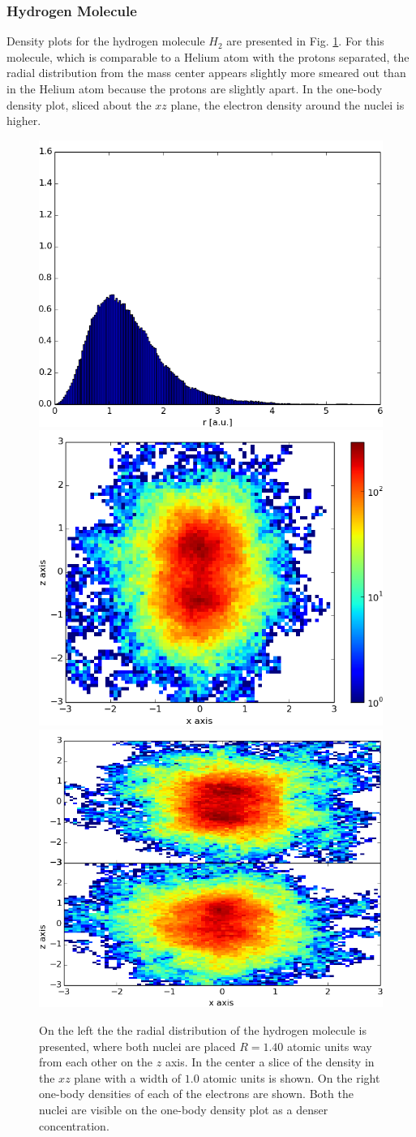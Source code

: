 		\subsubsection{Hydrogen Molecule}
			Density plots for the hydrogen molecule
                        $H_{2}$ are presented in
                        Fig. \ref{fig:oneBodyDensityHydrogenTwo}. For
                        this molecule, which is comparable to a Helium
                        atom with the protons separated, the radial
                        distribution from the mass center appears
                        slightly more smeared out than in the Helium
                        atom because the protons are slightly apart.
                        In the one-body density plot, sliced about the
                        \(xz\) plane, the electron density around the
                        nuclei is higher. 

			\begin{figure}[H]
				\centering \includegraphics[width=0.32\linewidth]{content/Results/figures/ChargeDensityHydrogenTwo}
				\centering \includegraphics[width=0.32\linewidth]{content/Results/figures/OneBodyDensityHydrogenTwo}
				\centering \includegraphics[width=0.32\linewidth]{content/Results/figures/OneBodyDensityElectronsHydrogenTwo}
				\protect\caption{On the left the the radial distribution of the hydrogen molecule is presented, where both nuclei are placed \(R = 1.40\) atomic units way from each other on the \(z\) axis. In the center a slice of the density in the \(xz\) plane with a width of \(1.0\) atomic units is shown. On the right one-body densities of each of the electrons are shown. Both the nuclei are visible on the one-body density plot as a denser concentration.}
				\label{fig:oneBodyDensityHydrogenTwo}
			\end{figure}



